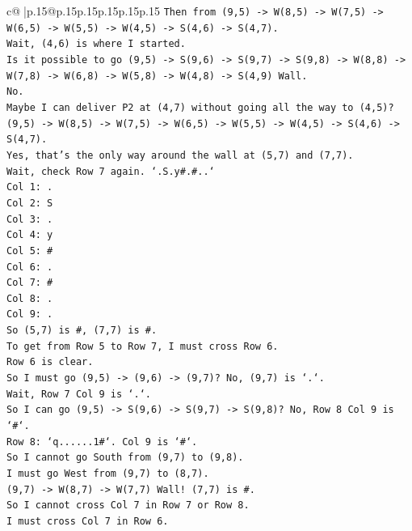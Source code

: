 \documentclass{article}
\begin{document}
{\begin{supertabular}{c@{$\;$}|p{.15\linewidth}@{}p{.15\linewidth}p{.15\linewidth}p{.15\linewidth}p{.15\linewidth}p{.15\linewidth}}
{{{\texttt{Then from (9,5) {-}> W(8,5) {-}> W(7,5) {-}> W(6,5) {-}> W(5,5) {-}> W(4,5) {-}> S(4,6) {-}> S(4,7).} \\
\texttt{Wait, (4,6) is where I started.} \\
\texttt{Is it possible to go (9,5) {-}> S(9,6) {-}> S(9,7) {-}> S(9,8) {-}> W(8,8) {-}> W(7,8) {-}> W(6,8) {-}> W(5,8) {-}> W(4,8) {-}> S(4,9) Wall.} \\
\texttt{No.} \\
\texttt{Maybe I can deliver P2 at (4,7) without going all the way to (4,5)?} \\
\texttt{(9,5) {-}> W(8,5) {-}> W(7,5) {-}> W(6,5) {-}> W(5,5) {-}> W(4,5) {-}> S(4,6) {-}> S(4,7).} \\
\texttt{Yes, that's the only way around the wall at (5,7) and (7,7).} \\
\texttt{Wait, check Row 7 again. `.S.y\#.\#..`} \\
\texttt{Col 1: .} \\
\texttt{Col 2: S} \\
\texttt{Col 3: .} \\
\texttt{Col 4: y} \\
\texttt{Col 5: \#} \\
\texttt{Col 6: .} \\
\texttt{Col 7: \#} \\
\texttt{Col 8: .} \\
\texttt{Col 9: .} \\
\texttt{So (5,7) is \#, (7,7) is \#.} \\
\texttt{To get from Row 5 to Row 7, I must cross Row 6.} \\
\texttt{Row 6 is clear.} \\
\texttt{So I must go (9,5) {-}> (9,6) {-}> (9,7)? No, (9,7) is `.`.} \\
\texttt{Wait, Row 7 Col 9 is `.`.} \\
\texttt{So I can go (9,5) {-}> S(9,6) {-}> S(9,7) {-}> S(9,8)? No, Row 8 Col 9 is `\#`.} \\
\texttt{Row 8: `q......1\#`. Col 9 is `\#`.} \\
\texttt{So I cannot go South from (9,7) to (9,8).} \\
\texttt{I must go West from (9,7) to (8,7).} \\
\texttt{(9,7) {-}> W(8,7) {-}> W(7,7) Wall! (7,7) is \#.} \\
\texttt{So I cannot cross Col 7 in Row 7 or Row 8.} \\
\texttt{I must cross Col 7 in Row 6.} \\
}}}
\end{supertabular}}
\end{document}

